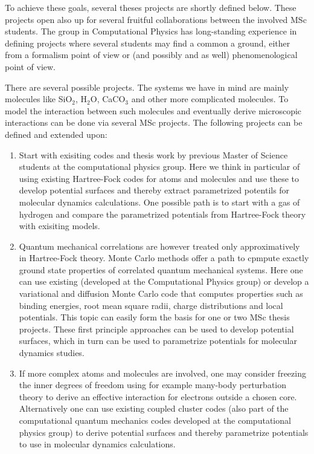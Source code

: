 \documentclass[%
oneside,                 %
final,                   %
10pt]{article}
\begin{document}
To achieve these goals, several theses projects are shortly defined
below. These projects open also up for several fruitful collaborations
between the involved MSc students. The group in Computational Physics
has long-standing experience in defining projects where several
students may find a common a ground, either from a formalism point of
view or (and possibly and as well) phenomenological point of view.

There are several possible projects. The systems we have in mind are
mainly molecules like SiO$_2$, H$_2$O, CaCO$_3$ and other more
complicated molecules. To model the interaction between such molecules
and eventually derive microscopic interactions can be done via several
MSc projects. The following projects can be defined and extended upon:

\begin{enumerate}
\item Start with exisiting codes and thesis work by previous Master of Science students at the computational physics group. Here we think in particular of using existing Hartree-Fock codes for atoms and molecules and use these to develop potential surfaces and thereby extract parametrized potentils for molecular dynamics calculations. One possible path is to start with a gas of hydrogen and compare the parametrized potentials from Hartree-Fock theory with exisiting models.

\item Quantum mechanical correlations are however treated only approximatively in Hartree-Fock theory. Monte Carlo methods offer a path to cpmpute exactly ground state properties of correlated quantum mechanical systems. Here one can use existing (developed at the Computational Physics group) or develop a variational and diffusion Monte Carlo code that computes properties such as binding energies, root mean square radii, charge distributions and local potentials.  This topic can easily form the basis for one or two MSc thesis projects. These first principle approaches can be used to develop potential surfaces, which in turn can be used to parametrize potentials for molecular dynamics studies.  

\item If more complex atoms and molecules are involved, one may consider freezing the inner degrees of freedom using for example many-body perturbation theory to derive an effective interaction for electrons outside a chosen core. Alternatively one can use existing coupled cluster codes (also part of the computational quantum mechanics codes developed at the computational physics group) to derive potential surfaces and thereby parametrize potentials to use in molecular dynamics calculations.  


\end{enumerate}
\end{document}
